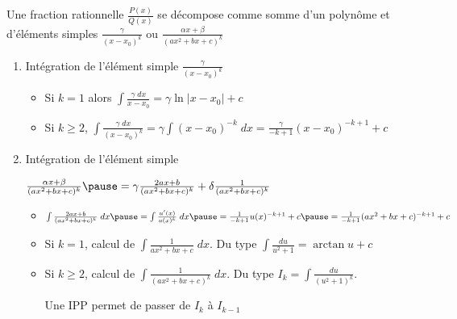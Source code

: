 \begin{frame}
Une fraction rationnelle $\frac{P(x)}{Q(x)}$ \pause se décompose comme somme 
d'un polynôme \pause et d'éléments simples \pause $\frac{\gamma}{(x - x_0)^k}$ \pause ou $\frac{\alpha x+\beta}{(a x^2+b x+c)^k}$

\pause
\begin{enumerate}
  \item Intégration de l'élément simple $\frac{\gamma}{(x - x_0)^k}$
\pause
  \begin{itemize}
     \item Si $k=1$ alors $\int \frac{\gamma \; dx}{x - x_0} = \gamma \ln|x - x_0|+c$
\pause
     \item Si $k\ge 2$, $\int \frac{\gamma \; dx}{(x - x_0)^k} = \gamma \int (x - x_0)^{-k} \; dx
= \frac{\gamma}{-k+1}(x - x_0)^{-k+1}+c$
  \end{itemize}

\pause
\medskip 

  \item Intégration de l'élément simple 

\hfil $\frac{\alpha x+\beta}{(a x^2+b x+c)^k} 
\pause = \gamma \frac{2a x+b}{(a x^2+b x+c)^k} + \delta \frac{1}{(a x^2+b x+c)^k}$

\pause
  \begin{itemize}
     \item $\int \frac{2a x+b}{(a x^2+b x+c)^k} \; dx \pause= \int \frac{u'(x)}{u(x)^k} \; dx \pause= \frac{1}{-k+1}u(x)^{-k+1}+c
\pause= \frac{1}{-k+1}(a x^2+b x+c)^{-k+1}+c$
 
 \pause   
     \item Si $k=1$, calcul de $\int \frac{1}{a x^2+b x+c}\; dx$.  \pause Du type $\int \frac{du}{u^2+1}=\arctan u + c$

\pause
     \item Si $k\ge 2$, calcul de $\int \frac{1}{(a x^2+b x+c)^k} \; dx$. \pause Du type $I_k =\int \frac{du}{(u^2+1)^k}$.
\pause

Une IPP permet de passer de $I_k$ à $I_{k-1}$
  \end{itemize}
\end{enumerate}
\end{frame}


